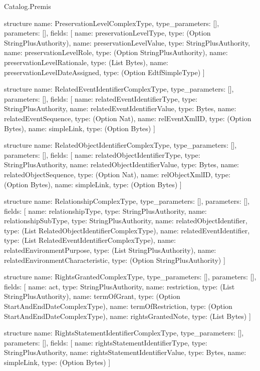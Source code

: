 \begin{lexlean}{Catalog.Premis}
\begin{semanticmodule}
structure{
  name: PreservationLevelComplexType,
  type_parameters: [],
  parameters: [],
  fields: [
    {name: preservationLevelType, type: (Option StringPlusAuthority)},
    {name: preservationLevelValue, type: StringPlusAuthority},
    {name: preservationLevelRole, type: (Option StringPlusAuthority)},
    {name: preservationLevelRationale, type: (List Bytes)},
    {name: preservationLevelDateAssigned, type: (Option EdtfSimpleType)}
  ]
}

structure{
  name: RelatedEventIdentifierComplexType,
  type_parameters: [],
  parameters: [],
  fields: [
    {name: relatedEventIdentifierType, type: StringPlusAuthority},
    {name: relatedEventIdentifierValue, type: Bytes},
    {name: relatedEventSequence, type: (Option Nat)},
    {name: relEventXmlID, type: (Option Bytes)},
    {name: simpleLink, type: (Option Bytes)}
  ]
}

structure{
  name: RelatedObjectIdentifierComplexType,
  type_parameters: [],
  parameters: [],
  fields: [
    {name: relatedObjectIdentifierType, type: StringPlusAuthority},
    {name: relatedObjectIdentifierValue, type: Bytes},
    {name: relatedObjectSequence, type: (Option Nat)},
    {name: relObjectXmlID, type: (Option Bytes)},
    {name: simpleLink, type: (Option Bytes)}
  ]
}

structure{
  name: RelationshipComplexType,
  type_parameters: [],
  parameters: [],
  fields: [
    {name: relationshipType, type: StringPlusAuthority},
    {name: relationshipSubType, type: StringPlusAuthority},
    {name: relatedObjectIdentifier, type: (List RelatedObjectIdentifierComplexType)},
    {name: relatedEventIdentifier, type: (List RelatedEventIdentifierComplexType)},
    {name: relatedEnvironmentPurpose, type: (List StringPlusAuthority)},
    {name: relatedEnvironmentCharacteristic, type: (Option StringPlusAuthority)}
  ]
}

structure{
  name: RightsGrantedComplexType,
  type_parameters: [],
  parameters: [],
  fields: [
    {name: act, type: StringPlusAuthority},
    {name: restriction, type: (List StringPlusAuthority)},
    {name: termOfGrant, type: (Option StartAndEndDateComplexType)},
    {name: termOfRestriction, type: (Option StartAndEndDateComplexType)},
    {name: rightsGrantedNote, type: (List Bytes)}
  ]
}

structure{
  name: RightsStatementIdentifierComplexType,
  type_parameters: [],
  parameters: [],
  fields: [
    {name: rightsStatementIdentifierType, type: StringPlusAuthority},
    {name: rightsStatementIdentifierValue, type: Bytes},
    {name: simpleLink, type: (Option Bytes)}
  ]
}


\end{semanticmodule}
\end{lexlean}
